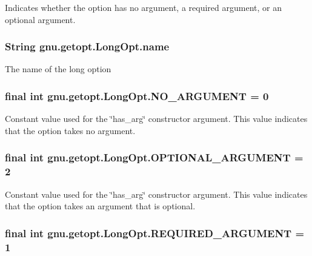 \label{classgnu_1_1getopt_1_1_long_opt_a7a8d529950461c0c30ef2df667df017b}
Indicates whether the option has no argument, a required argument, or an optional argument. \hypertarget{classgnu_1_1getopt_1_1_long_opt_a4b2a1686f77ce6aa2e36673cf0b074d9}{
\subsubsection[{name}]{\setlength{\rightskip}{0pt plus 5cm}String {\bf gnu.getopt.LongOpt.name}}}
\label{classgnu_1_1getopt_1_1_long_opt_a4b2a1686f77ce6aa2e36673cf0b074d9}
The name of the long option \hypertarget{classgnu_1_1getopt_1_1_long_opt_a5af856e8de6a5f528d4da2b8706f7abe}{
\subsubsection[{NO\_\-ARGUMENT}]{\setlength{\rightskip}{0pt plus 5cm}final int {\bf gnu.getopt.LongOpt.NO\_\-ARGUMENT} = 0}}
\label{classgnu_1_1getopt_1_1_long_opt_a5af856e8de6a5f528d4da2b8706f7abe}
Constant value used for the \char`\"{}has\_\-arg\char`\"{} constructor argument. This value indicates that the option takes no argument. \hypertarget{classgnu_1_1getopt_1_1_long_opt_a31819aae074fa1d80f547817640b31c1}{
\subsubsection[{OPTIONAL\_\-ARGUMENT}]{\setlength{\rightskip}{0pt plus 5cm}final int {\bf gnu.getopt.LongOpt.OPTIONAL\_\-ARGUMENT} = 2}}
\label{classgnu_1_1getopt_1_1_long_opt_a31819aae074fa1d80f547817640b31c1}
Constant value used for the \char`\"{}has\_\-arg\char`\"{} constructor argument. This value indicates that the option takes an argument that is optional. \hypertarget{classgnu_1_1getopt_1_1_long_opt_a8105c98436b46a0b4de39a3afab230c2}{
\subsubsection[{REQUIRED\_\-ARGUMENT}]{\setlength{\rightskip}{0pt plus 5cm}final int {\bf gnu.getopt.LongOpt.REQUIRED\_\-ARGUMENT} = 1}}
